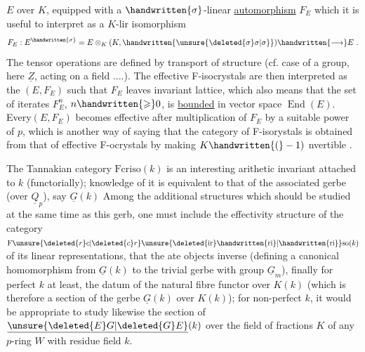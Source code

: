 
$E$ over $K$, equipped with a $\handwritten{\sigma}$-linear  \uline{automorphism} $F_E$\handwritten{;}  which it is useful to interpret as a $K$-lir isomorphism
\[
F_E : E^{\handwritten{\sigma}} = E\otimes_K(K,\handwritten{\unsure{\deleted{\sigma}\sigma|\sigma}})\handwritten{\longrightarrow} E\ .
\]
The tensor operations are defined by transport of structure (cf. case of a group, here $\underline{Z}$, acting on a field ....). The effective F-isocrystals are then interpreted as the $(E,F_E)$ such that $F_E$ leaves invariant  lattice, which also means that the set of iterates $F_E^n$, $n\handwritten{\geqslant}0$, is \uline{bounded} in  vector space $\operatorname{End}(E)$. Every$(E,F_E)$ becomes  effective after multiplication of $F_E$ by a suitable power of $p$, which is another way of saying that the category of F-isorystals is obtained from that of effective F-ocrystals  by making $K\handwritten{(}-1)$ nvertible .

 The Tannakian category $\mathrm{Fcriso}(k)$ is an interesting arithetic invariant attached to $k$ (functorially);  knowledge of it is equivalent to that of the associated gerbe (over $\underline{Q}_p$), say $\underline{G}(k)$ Among the additional structures which should be studied at the same time as this gerb, one must include the effectivity structure of the category $\mathrm{F}\unsure{\deleted{r}c|\deleted{c}r}\unsure{\deleted{\mathrm{ir}}\handwritten{\mathrm{ri}}|\handwritten{\mathrm{ri}}}\mathrm{so}(k)$ of  its linear representations, that  the ate objects inverse (defining a canonical homomorphism from $\underline{G}(k)$ to the trivial gerbe with group $\underline{G}_m$), finally for perfect $k$ at least, the datum of the natural fibre functor over $K(k)$ (which is therefore a section of the gerbe $\underline{G}(k)$ over $K(k)$); for non-perfect $k$, it would be appropriate  to study likewise the section of $\underline{\unsure{\deleted{E}G|\deleted{G}E}}(k)$ over the field of fractions $K$ of any $p$-ring $W$ with residue field $k$.

